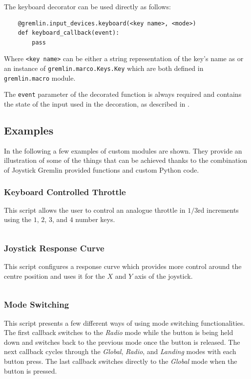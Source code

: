 \documentclass[a4, 10pt]{article}
\newcommand{\JG}{Joystick Gremlin}
\begin{document}
The keyboard decorator can be used directly as follows:
\begin{verbatim}
    @gremlin.input_devices.keyboard(<key name>, <mode>)
    def keyboard_callback(event):
        pass
\end{verbatim}

Where \verb+<key name>+ can be either a string representation of the
key's name as or an instance of \verb+gremlin.marco.Keys.Key+ which are
both defined in\\\verb+gremlin.macro+ module.

The \verb+event+ parameter of the decorated function is always required
and contains the state of the input used in the decoration, as described
in .


\subsection{Examples}
\label{sec:cm_examples}

In the following a few examples of custom modules are shown. They
provide an illustration of some of the things that can be achieved
thanks to the combination of \JG{} provided functions and custom Python
code.


\subsubsection{Keyboard Controlled Throttle}

This script allows the user to control an analogue throttle in $1/3$rd
increments using the $1$, $2$, $3$, and $4$ number keys.

\inputminted[xleftmargin=2em]{python}{examples/keyboard_throttle.py}


\subsubsection{Joystick Response Curve}

This script configures a response curve which provides more control
around the centre position and uses it for the $X$ and $Y$ axis of the
joystick.

\inputminted[xleftmargin=2em]{python}{examples/response_curve.py}


\subsubsection{Mode Switching}

This script presents a few different ways of using mode switching
functionalities. The first callback switches to the \emph{Radio} mode
while the button is being held down and switches back to the previous
mode once the button is released. The next callback cycles through the
\emph{Global}, \emph{Radio}, and \emph{Landing} modes with each button
press. The last callback switches directly to the \emph{Global} mode
when the button is pressed.
\end{document}
